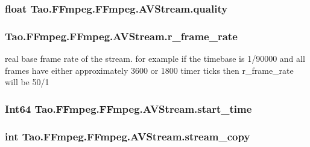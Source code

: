 \label{struct_tao_1_1_f_fmpeg_1_1_f_fmpeg_1_1_a_v_stream_a17d9762f0afbd89507765d5570c93947}
\hypertarget{struct_tao_1_1_f_fmpeg_1_1_f_fmpeg_1_1_a_v_stream_a55bdc7c79f4213ac0a8ce7afbf54eb0d}{
\subsubsection[{quality}]{\setlength{\rightskip}{0pt plus 5cm}float {\bf Tao.FFmpeg.FFmpeg.AVStream.quality}}}
\label{struct_tao_1_1_f_fmpeg_1_1_f_fmpeg_1_1_a_v_stream_a55bdc7c79f4213ac0a8ce7afbf54eb0d}
\hypertarget{struct_tao_1_1_f_fmpeg_1_1_f_fmpeg_1_1_a_v_stream_a9db3cba7ae05cd3387ee56a75a4c38eb}{
\subsubsection[{r\_\-frame\_\-rate}]{ {\bf Tao.FFmpeg.FFmpeg.AVStream.r\_\-frame\_\-rate}}}
\label{struct_tao_1_1_f_fmpeg_1_1_f_fmpeg_1_1_a_v_stream_a9db3cba7ae05cd3387ee56a75a4c38eb}
real base frame rate of the stream. for example if the timebase is 1/90000 and all frames have either approximately 3600 or 1800 timer ticks then r\_\-frame\_\-rate will be 50/1 \hypertarget{struct_tao_1_1_f_fmpeg_1_1_f_fmpeg_1_1_a_v_stream_a56e236bec851080e48eca31b83ab5078}{
\subsubsection[{start\_\-time}]{\setlength{\rightskip}{0pt plus 5cm}Int64 {\bf Tao.FFmpeg.FFmpeg.AVStream.start\_\-time}}}
\label{struct_tao_1_1_f_fmpeg_1_1_f_fmpeg_1_1_a_v_stream_a56e236bec851080e48eca31b83ab5078}
\hypertarget{struct_tao_1_1_f_fmpeg_1_1_f_fmpeg_1_1_a_v_stream_a5ec28ddf1f03623fbfe486aaee65d5d4}{
\subsubsection[{stream\_\-copy}]{\setlength{\rightskip}{0pt plus 5cm}int {\bf Tao.FFmpeg.FFmpeg.AVStream.stream\_\-copy}}}
